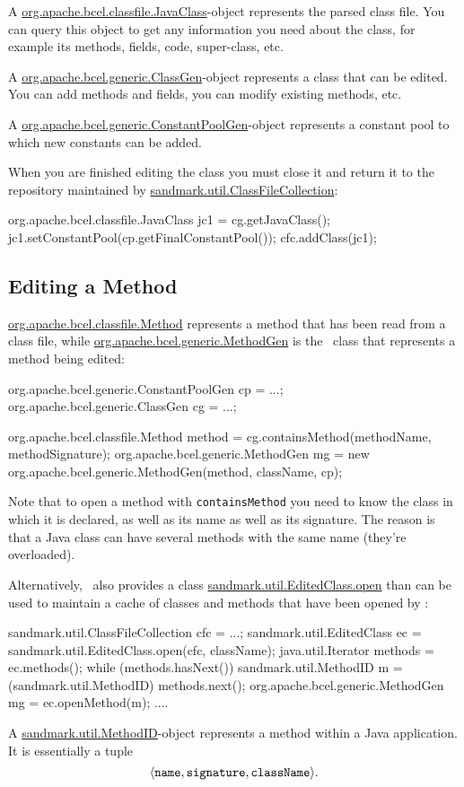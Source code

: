 A \url{org.apache.bcel.classfile.JavaClass}-object
represents the parsed class file. You can query this
object to get any information you need about the
class, for example its methods, fields, code, super-class, etc.

A \url{org.apache.bcel.generic.ClassGen}-object represents
a class that can be edited. You can add methods and fields,
you can modify existing methods, etc.

A \url{org.apache.bcel.generic.ConstantPoolGen}-object
represents a constant pool to which new constants can
be added.

When you are finished editing the class you must close
it and return it to the repository maintained by
\url{sandmark.util.ClassFileCollection}:
\begin{listingcont}
   org.apache.bcel.classfile.JavaClass jc1 = cg.getJavaClass();
   jc1.setConstantPool(cp.getFinalConstantPool());
   cfc.addClass(jc1);
\end{listingcont}


\subsection{Editing a Method}
\url{org.apache.bcel.classfile.Method} represents a 
method that has been read from a class file, while
\url{org.apache.bcel.generic.MethodGen} is the \BCEL\ class
that represents a method being edited:
\begin{listing}{1}
   org.apache.bcel.generic.ConstantPoolGen cp = ...;
   org.apache.bcel.generic.ClassGen cg = ...;

   org.apache.bcel.classfile.Method method = 
      cg.containsMethod(methodName, methodSignature);
   org.apache.bcel.generic.MethodGen mg = 
      new org.apache.bcel.generic.MethodGen(method, className, cp);
\end{listing}
Note that to open a method with {\tt containsMethod}
you need to know the class in which it is declared, 
as well as its name as well as its signature.
The reason is that a Java class can have several methods
with the same name (they're overloaded).


Alternatively, \SM\ also provides a class 
\url{sandmark.util.EditedClass.open} than 
can be used to maintain a cache of classes
and methods that have been opened by \BCEL:
\begin{listing}{1}
    sandmark.util.ClassFileCollection cfc = ...;
    sandmark.util.EditedClass ec = sandmark.util.EditedClass.open(cfc, className);
   java.util.Iterator methods = ec.methods();
   while (methods.hasNext()){
       sandmark.util.MethodID m = (sandmark.util.MethodID) methods.next();
       org.apache.bcel.generic.MethodGen mg = ec.openMethod(m);
       ....
   }
\end{listing}
A \url{sandmark.util.MethodID}-object represents a 
method within a Java application. It is essentially a tuple 
   $$\langle {\tt name}, {\tt signature}, {\tt className}\rangle.$$



